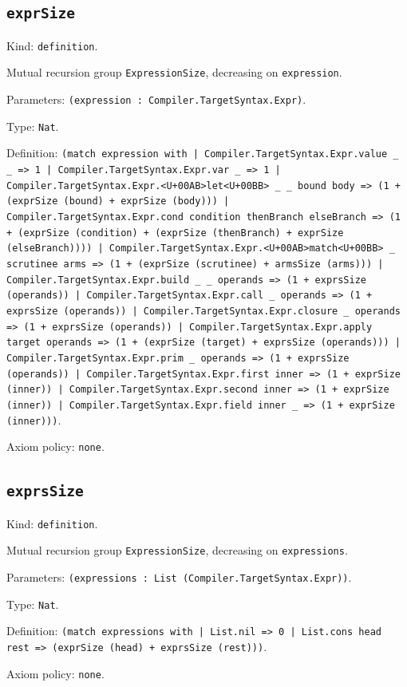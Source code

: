 \documentclass[11pt]{article}
\begin{document}
\subsection*{\texttt{exprSize}}
\noindent Kind: \texttt{definition}.\par
\noindent Mutual recursion group \texttt{ExpressionSize}, decreasing on \texttt{expression}.\par
\noindent Parameters: \texttt{(expression : Compiler.TargetSyntax.Expr)}.\par
\noindent Type: \texttt{Nat}.\par
\noindent Definition: \texttt{(match expression with | Compiler.TargetSyntax.Expr.value \_ \_ => 1 | Compiler.TargetSyntax.Expr.var \_ => 1 | Compiler.TargetSyntax.Expr.<U+00AB>let<U+00BB> \_ \_ bound body => (1 + (exprSize (bound) + exprSize (body))) | Compiler.TargetSyntax.Expr.cond condition thenBranch elseBranch => (1 + (exprSize (condition) + (exprSize (thenBranch) + exprSize (elseBranch)))) | Compiler.TargetSyntax.Expr.<U+00AB>match<U+00BB> \_ scrutinee arms => (1 + (exprSize (scrutinee) + armsSize (arms))) | Compiler.TargetSyntax.Expr.build \_ \_ operands => (1 + exprsSize (operands)) | Compiler.TargetSyntax.Expr.call \_ operands => (1 + exprsSize (operands)) | Compiler.TargetSyntax.Expr.closure \_ operands => (1 + exprsSize (operands)) | Compiler.TargetSyntax.Expr.apply target operands => (1 + (exprSize (target) + exprsSize (operands))) | Compiler.TargetSyntax.Expr.prim \_ operands => (1 + exprsSize (operands)) | Compiler.TargetSyntax.Expr.first inner => (1 + exprSize (inner)) | Compiler.TargetSyntax.Expr.second inner => (1 + exprSize (inner)) | Compiler.TargetSyntax.Expr.field inner \_ => (1 + exprSize (inner)))}.\par
\noindent Axiom policy: \texttt{none}.\par
\subsection*{\texttt{exprsSize}}
\noindent Kind: \texttt{definition}.\par
\noindent Mutual recursion group \texttt{ExpressionSize}, decreasing on \texttt{expressions}.\par
\noindent Parameters: \texttt{(expressions : List (Compiler.TargetSyntax.Expr))}.\par
\noindent Type: \texttt{Nat}.\par
\noindent Definition: \texttt{(match expressions with | List.nil => 0 | List.cons head rest => (exprSize (head) + exprsSize (rest)))}.\par
\noindent Axiom policy: \texttt{none}.\par
\end{document}

